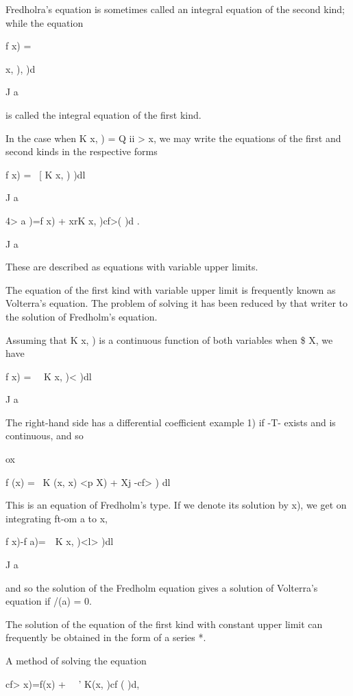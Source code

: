 %
%

Fredholra's
equation is sometimes called an integral equation of the second kind;
while the equation

f x) = \ \ \ \ {x, ), )d

J a

is called the integral equation of the first kind.

In the case when K x, ) = Q ii > x, we may write the equations of the
first and second kinds in the respective forms

f x) = \ [ K x, ) )dl

J a

4> a )=f x) + xrK x, )cf>( )d .

J a

These are described as equations with variable upper limits.


The equation of the first kind with variable upper limit is frequently
known as Volterra's equation. The problem of solving it has been
reduced by that writer to the solution of Fredholm's equation.

Assuming that K x, ) is a continuous function of both variables when
\$ X, we have

f x) = \ \ K x, )< )dl

J a

The right-hand side has a differential coefficient  example 1)
if -T- exists and is continuous, and so

ox

f (x) = \ K (x, x) <p X) + Xj -cf> ) dl

This is an equation of Fredholm's type. If we denote its solution by
x), we get on integrating ft-om a to x,

f x)-f a)=\ \ K x, )<l> )dl

J a

and so the solution of the Fredholm equation gives a solution of
Volterra's equation if /(a) = 0.

The solution of the equation of the first kind with constant upper
limit can frequently be obtained in the form of a series *.

A
method of solving the equation

cf> x)=f(x) + \ \ ' K(x, )cf ( )d,

}
